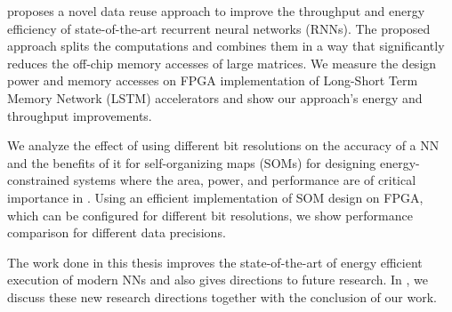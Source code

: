  proposes a novel data reuse approach to improve the throughput and energy efficiency of state-of-the-art recurrent neural networks (RNNs). The proposed approach splits the computations and combines them in a way that significantly reduces the off-chip memory accesses of large matrices. We measure the design power and memory accesses on FPGA implementation of Long-Short Term Memory Network (LSTM) accelerators and show our approach's energy and throughput improvements.

We analyze the effect of using different bit resolutions on the accuracy of a NN and the benefits of it for self-organizing maps (SOMs) for designing energy-constrained systems where the area, power, and performance are of critical importance in . Using an efficient implementation of SOM design on FPGA, which can be configured for different bit resolutions, we show performance comparison for different data precisions. 

The work done in this thesis improves the state-of-the-art of energy efficient execution of modern NNs and also gives directions to future research. In , we discuss these new research directions together with the conclusion of our work.